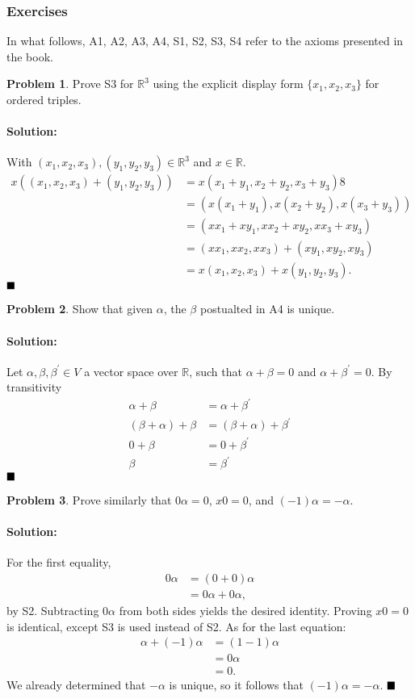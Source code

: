 \documentclass[]{article}
\newcommand{\RR}{\mathbb{R}}
\theoremstyle{definition}
\newtheorem{problem}{Problem}
\newenvironment{solution}{\paragraph{Solution:}}{\hfill$\blacksquare \\$}
\begin{document}
\subsubsection{Exercises}
In what follows, A1, A2, A3, A4, S1, S2, S3, S4 refer to the axioms presented in the book.
\begin{problem}
	Prove S3 for $\RR^3$ using the explicit display form $\{x_1, x_2, x_3\}$ for ordered triples.
\end{problem}
\begin{solution}

With $(x_1, x_2, x_3), (y_1, y_2, y_3) \in \RR^3$ and $x \in \RR$. 
	\begin{align*} 
		x((x_1, x_2, x_3) + (y_1, y_2, y_3)) &= x(x_1 + y_1, x_2 + y_2, x_3 + y_3) 8 \\ 
	 &=  (x(x_1 + y_1), x(x_2 + y_2), x(x_3 + y_3)) \\
	 &= (xx_1 + xy_1, xx_2 + xy_2, xx_3 + xy_3) \\
	 &= (xx_1, xx_2, xx_3) + (xy_1, xy_2, xy_3) \\
	 &= x(x_1, x_2, x_3) + x(y_1, y_2, y_3).
	\end{align*}
\end{solution}
\begin{problem}
	Show that given $\alpha$, the $\beta$ postualted in A4 is unique.
\end{problem}
\begin{solution}
	Let $\alpha, \beta, \beta^\prime \in V$ a vector space over $\RR$, such that $\alpha + \beta = 0$ and $\alpha + \beta^\prime = 0$. By transitivity
	\begin{align*}
		\alpha + \beta &= \alpha + \beta^\prime \\
		(\beta + \alpha) + \beta &= (\beta + \alpha) + \beta^\prime \\
		0 + \beta &= 0 + \beta^\prime \\
		\beta &= \beta^\prime
	\end{align*}
\end{solution}
\begin{problem}
	Prove similarly that $0\alpha = 0$, $x0 = 0$, and $(-1)\alpha = -\alpha$.
\end{problem}
\begin{solution}
For the first equality, 
\begin{align*}
	0\alpha &= (0 + 0)\alpha \\
	& = 0\alpha + 0\alpha,
\end{align*}
 by S2. Subtracting $0\alpha$ from both sides yields the desired identity. Proving $x0 = 0$ is identical, except S3 is used instead of S2. As for the last equation:
 \begin{align*}
 	\alpha + (-1)\alpha &= (1 - 1)\alpha \\
 	&= 0\alpha \\
 	&= 0.
 \end{align*}
 We already determined that $-\alpha$ is unique, so it follows that $(-1)\alpha = -\alpha$.
\end{solution}
\end{document}
